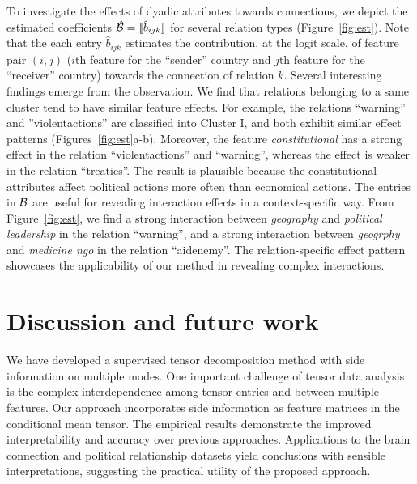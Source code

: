 \documentclass[12pt]{article}
\theoremstyle{definition}
\theoremstyle{definition}
\begin{document}
To investigate the effects of dyadic attributes towards connections, we depict the estimated coefficients $\hat {\mathcal{B}}=\llbracket \hat b_{ijk} \rrbracket$ for several relation types (Figure~\ref{fig:est}). Note that the each entry $\hat b_{ijk}$ estimates the contribution, at the logit scale, of feature pair $(i,j)$ ($i$th feature for the ``sender'' country and $j$th feature for the ``receiver'' country) towards the connection of relation $k$. Several interesting findings emerge from the observation. We find that relations belonging to a same cluster tend to have similar feature effects. For example, the relations ``warning'' and ''violentactions'' are classified into Cluster I, and both exhibit similar effect patterns (Figures~\ref{fig:est}a-b). Moreover, the feature \emph{constitutional} has a strong effect in the relation ``violentactions'' and ``warning'', whereas the effect is weaker in the relation ``treaties''. The result is plausible because the constitutional attributes affect political actions more often than economical actions. The entries in $\mathcal{B}$ are useful for revealing interaction effects in a context-specific way. 
From Figure~\ref{fig:est}, we find a strong interaction between \emph{geography} and \emph{political leadership} in the relation ``warning'', and a strong interaction between \emph{geogrphy} and \emph{medicine ngo} in the relation ``aidenemy''. The relation-specific effect pattern showcases the applicability of our method in revealing complex interactions. 


\section{Discussion and future work}\label{sec:con}
We have developed a supervised tensor decomposition method with side information on multiple modes. One important challenge of tensor data analysis is the complex interdependence among tensor entries and between multiple features. Our approach incorporates side information as feature matrices in the conditional mean tensor. The empirical results demonstrate the improved interpretability and accuracy over previous approaches. Applications to the brain connection and political relationship datasets yield conclusions with sensible interpretations, suggesting the practical utility of the proposed approach.
 
\end{document}
